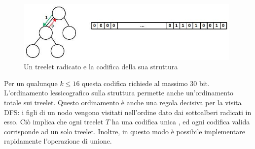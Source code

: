 \begin{figure}[htbp]
	\centering
	\includegraphics[width=11cm]{capitolo2/grafo3}
	\caption{Un treelet radicato e la codifica della sua struttura}
	\label{figura}
\end{figure}

Per un qualunque $ k \le 16 $ questa codifica richiede al massimo 30 bit.
L'ordinamento lessicografico sulla struttura permette anche un'ordinamento totale sui treelet. Questo ordinamento \`e anche una regola decisiva per la visita DFS: i figli di un nodo vengono visitati nell'ordine dato dai sottoalberi radicati in esso.
Ci\`o implica che ogni treelet $ T $ ha una codifica unica , ed ogni codifica valida corrisponde ad un solo treelet. Inoltre, in questo modo \`e possibile implementare rapidamente l'operazione di unione.\\

